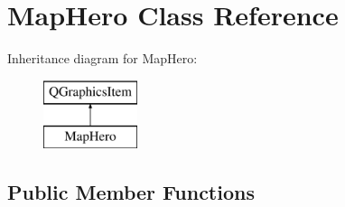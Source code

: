 \hypertarget{class_map_hero}{\section{Map\-Hero Class Reference}
\label{class_map_hero}
}
Inheritance diagram for Map\-Hero\-:\begin{figure}[H]
\begin{center}
\leavevmode
\includegraphics[height=2.000000cm]{class_map_hero}
\end{center}
\end{figure}
\subsection*{Public Member Functions}

